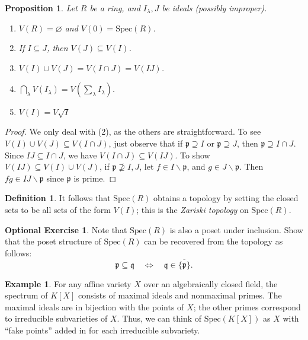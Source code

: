 \documentclass{amsart}[12pt]
\newcommand{\p}{{\mathfrak p}}
\newcommand{\q}{{\mathfrak q}}
\newcommand{\DEF}[1]{\emph{#1}\index{#1}}
\numberwithin{equation}{section}
\theoremstyle{plain} %
\newtheorem{proposition}[equation]{Proposition}
\theoremstyle{definition}
\newtheorem{defn}[equation]{Definition}
\newtheorem{ex}[equation]{Example}
\newtheorem{exer}[equation]{Optional Exercise}
\theoremstyle{remark}
\newcommand{\Spec}{\mathrm{Spec}}
\begin{document}
\begin{proposition}
	Let $R$ be a ring, and $I_{\lambda},J$ be ideals (possibly improper).
	\begin{enumerate}
		\item[(0)] $V(R) = \varnothing$ and $V(0) = \Spec(R)$.
		\item If $I \subseteq J$, then $V(J)\subseteq V(I)$.
		\item $V(I) \cup V(J) = V(I \cap J)=V(IJ)$.
		\item $\bigcap_{\lambda} V(I_{\lambda}) =V(\sum_{\lambda} I_{\lambda})$.
		\item $V(I)=V\sqrt{I}$
	\end{enumerate}
\end{proposition} 
\begin{proof}
We only deal with (2), as the others are straightforward.
 To see $V(I)\cup V(J)\subseteq V(I \cap J)$, just observe that if $\p \supseteq I$ or $\p \supseteq J$, then $\p \supseteq I \cap J$.
		Since $IJ\subseteq I\cap J$, we have $V(I\cap J) \subseteq V(IJ)$. To show $V(IJ)\subseteq V(I)\cup V(J)$, if $\p \not\supseteq I, J$, let $f\in I\smallsetminus \p$, and $g \in J\smallsetminus \p$. Then $fg \in IJ \smallsetminus \p$ since $\p$ is prime.
		\end{proof}


\begin{defn} It follows that $\Spec(R)$ obtains a topology by setting the closed sets to be all sets of the form $V(I)$; this is the \DEF{Zariski topology} on $\Spec(R)$.
\end{defn}

\begin{exer} Note that $\Spec(R)$ is also a poset under inclusion. Show that the poset structure of $\Spec(R)$ can be recovered from the topology as follows: 
\[ \p\subseteq \q \quad \Leftrightarrow \quad \q \in \overline{\{ \p \}}.\]
\end{exer}


\begin{ex} For any affine variety $X$ over an algebraically closed field, the spectrum of $K[X]$ consists of maximal ideals and nonmaximal primes. The maximal ideals are in bijection with the points of $X$; the other primes correspond to irreducible subvarieties of $X$. Thus, we can think of $\Spec(K[X])$ as $X$ with ``fake points'' added in for each irreducible subvariety.
\end{ex}
\end{document}
